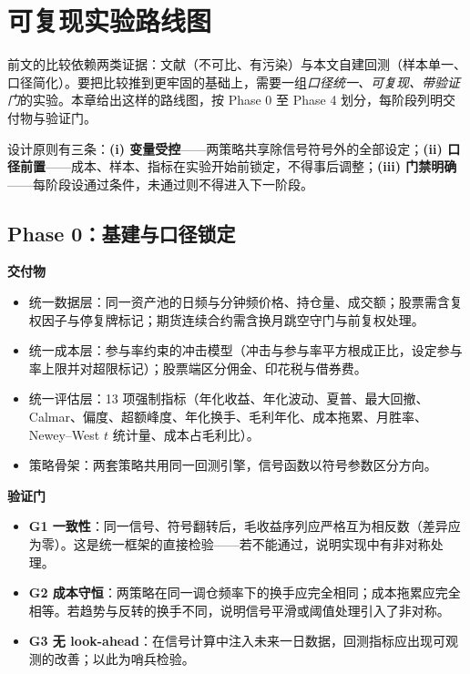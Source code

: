 \section{可复现实验路线图}\label{sec:reproduce}

前文的比较依赖两类证据：文献（不可比、有污染）与本文自建回测（样本单一、口径简化）。要把比较推到更牢固的基础上，需要一组\emph{口径统一、可复现、带验证门}的实验。本章给出这样的路线图，按 Phase 0 至 Phase 4 划分，每阶段列明交付物与验证门。

设计原则有三条：\textbf{(i) 变量受控}——两策略共享除信号符号外的全部设定；\textbf{(ii) 口径前置}——成本、样本、指标在实验开始前锁定，不得事后调整；\textbf{(iii) 门禁明确}——每阶段设通过条件，未通过则不得进入下一阶段。

\subsection{Phase 0：基建与口径锁定}

\textbf{交付物}
\begin{itemize}[leftmargin=2.2em]
  \item 统一数据层：同一资产池的日频与分钟频价格、持仓量、成交额；股票需含复权因子与停复牌标记；期货连续合约需含换月跳空守门与前复权处理。
  \item 统一成本层：参与率约束的冲击模型（冲击与参与率平方根成正比，设定参与率上限并对超限标记）；股票端区分佣金、印花税与借券费。
  \item 统一评估层：13 项强制指标（年化收益、年化波动、夏普、最大回撤、Calmar、偏度、超额峰度、年化换手、毛利年化、成本拖累、月胜率、Newey--West $t$ 统计量、成本占毛利比）。
  \item 策略骨架：两套策略共用同一回测引擎，信号函数以符号参数区分方向。
\end{itemize}

\textbf{验证门}
\begin{itemize}[leftmargin=2.2em]
  \item \textbf{G1 一致性}：同一信号、符号翻转后，毛收益序列应严格互为相反数（差异应为零）。这是统一框架的直接检验——若不能通过，说明实现中有非对称处理。
  \item \textbf{G2 成本守恒}：两策略在同一调仓频率下的换手应完全相同；成本拖累应完全相等。若趋势与反转的换手不同，说明信号平滑或阈值处理引入了非对称。
  \item \textbf{G3 无 look-ahead}：在信号计算中注入未来一日数据，回测指标应出现可观测的改善；以此为哨兵检验。
\end{itemize}

